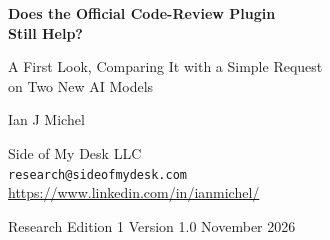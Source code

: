 \documentclass[11pt]{article}
\begin{document}
\begin{center}
{\fontsize{24}{29}\selectfont\bfseries Does the Official Code-Review Plugin\\[2pt] Still Help?\par}
\vspace{8pt}
{\Large A First Look, Comparing It with a Simple Request\\ on Two New AI Models\par}
\vspace{16pt}
{\fontsize{16}{20}\selectfont Ian J Michel\par}
\vspace{6pt}
{\normalsize Side of My Desk LLC\\ \texttt{research@sideofmydesk.com}\\ \url{https://www.linkedin.com/in/ianmichel/}\par}
\vspace{8pt}
{\small Research Edition 1 \quad\textbullet\quad Version 1.0 \quad\textbullet{} November 2026\par}
\end{center}
\vspace{6pt}
\end{document}
